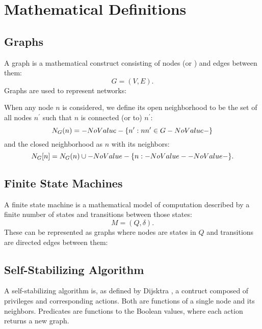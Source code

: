 \section{Mathematical Definitions}
\label{sec:math-defin}

\subsection{Graphs}
\label{sec:math-defin:graphs}

A \gls{graph} is a mathematical construct
  consisting of \glspl{node} (or ) and \glspl{edge} between them:
  \[ G = (V, E). \]
Graphs are used to represent networks:

When any node $n$ is considered, we define its \gls{open neighborhood} to be
  the set of all nodes $n^\prime$ such that $n$ is connected (or  to) $n^\prime$:
  \[ \OpenNeighborhood{n}[G] = \Set{n^\prime}[nn^\prime \in G] \]
  and the \gls{closed neighborhood} as $n$ with its neighbors:
  \[ \ClosedNeighborhood{n}[G] = \OpenNeighborhood{n}[G] \cup \Set{n}. \]

\subsection{Finite State Machines}
\label{sec:math-defin:fsm}

A \gls{finite state machine} is a mathematical model of computation
  described by a finite number of states and transitions between those states:
  \[ M = (Q, \delta). \]
These can be represented as graphs where nodes are states in $Q$ and
  transitions are directed edges between them:

\subsection{Self-Stabilizing Algorithm}
\label{sec:math-defin:self-stab-algor}

A self-stabilizing algorithm is, as defined by
  Dijsktra \autocite{Dijkstra:1974:SSS:361179.361202},
  a contruct composed of \glspl{privilege} and corresponding \glspl{action}.
Both are functions of a single node and its neighbors.
Predicates are functions to the Boolean values,
  where each action returns a new graph.

